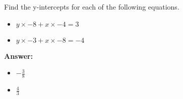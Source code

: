  Find the y-intercepts for each of the following equations. \begin{itemize}\item \( y \times -8 + x \times -4 = 3 \)\item \( y \times -3 + x \times -8 = -4 \)\end{itemize}

        \textbf{Answer:} \begin{itemize}\item \( -\frac{3}{8} \)\item \( \frac{4}{3} \)\end{itemize}
